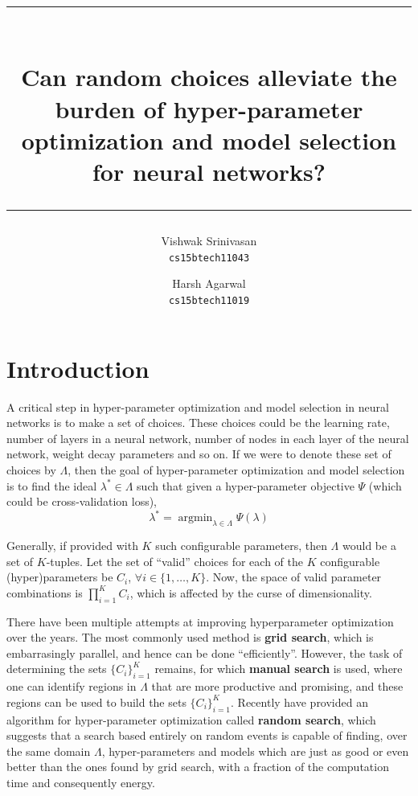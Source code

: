 \documentclass[12pt]{article}
\title{\rule{\linewidth}{2pt}\\\vspace{2mm}
Can random choices alleviate the burden of hyper-parameter optimization and model selection for neural networks?\\
\rule{\linewidth}{2pt}}
\author{Vishwak Srinivasan\\\texttt{cs15btech11043}
\and
Harsh Agarwal\\\texttt{cs15btech11019}}
\date{}
\newcommand{\argmin}{\mathop{\mathrm{argmin}}}
\newcommand{\pbreak}{\vspace{4mm}}
\begin{document}
\maketitle

\section{Introduction}
\begin{flushleft}
A critical step in hyper-parameter optimization and model selection in neural networks is to make a set of choices. These choices could be the learning rate, number of layers in a neural network, number of nodes in each layer of the neural network, weight decay parameters and so on. If we were to denote these set of choices by \(\Lambda\), then the goal of hyper-parameter optimization and model selection is to find the ideal \(\lambda^{*} \in \Lambda\) such that given a hyper-parameter objective \(\Psi\) (which could be cross-validation loss),
\begin{equation}
\lambda^{*} = \argmin_{\lambda \in \Lambda} \Psi(\lambda)
\end{equation}

Generally, if provided with \(K\) such configurable parameters, then \(\Lambda\) would be a set of \(K\)-tuples. Let the set of ``valid'' choices for each of the \(K\) configurable (hyper)parameters be \(C_{i}\), \(\forall i \in \{1, \ldots, K\}\). Now, the space of valid parameter combinations is \(\displaystyle \prod_{i=1}^{K} C_{i}\), which is affected by the curse of dimensionality.
\pbreak

There have been multiple attempts at improving hyperparameter optimization over the years. The most commonly used method is \textbf{grid search}, which is embarrasingly parallel, and hence can be done ``efficiently''. However, the task of determining the sets \(\displaystyle \lbrace C_{i} \rbrace_{i=1}^{K}\) remains, for which \textbf{manual search} is used, where one can identify regions in \(\Lambda\) that are more productive and promising, and these regions can be used to build the sets \(\displaystyle \lbrace C_{i} \rbrace_{i=1}^{K}\). Recently \citet{random-search} have provided an algorithm for hyper-parameter optimization called \textbf{random search}, which suggests that a search based entirely on random events is capable of finding, over the same domain \(\Lambda\), hyper-parameters and models which are just as good or even better than the ones found by grid search, with a fraction of the computation time and consequently energy.
\end{flushleft}
\end{document}
